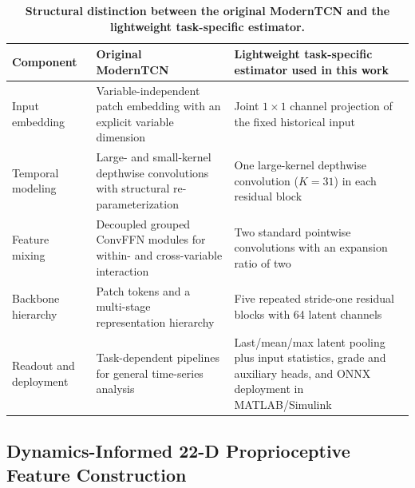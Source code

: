 \documentclass{ieeeaccess}
\newcommand{\citep}[1]{\cite{#1}}
\begin{document}
\begin{table}[!tbp]
\centering
\caption{\textbf{Structural distinction between the original ModernTCN and the lightweight task-specific estimator.}}
\label{tab:moderntcn_variant_comparison}
\setlength{\tabcolsep}{3pt}
\begin{tabular}{|p{}|p{}|p{}|}
\hline
Component & Original ModernTCN~\citep{Luo2024ModernTCN} & Lightweight task-specific estimator used in this work \\
\hline
Input embedding & Variable-independent patch embedding with an explicit variable dimension & Joint $1\times1$ channel projection of the fixed historical input \\
Temporal modeling & Large- and small-kernel depthwise convolutions with structural re-parameterization & One large-kernel depthwise convolution ($K=31$) in each residual block \\
Feature mixing & Decoupled grouped ConvFFN modules for within- and cross-variable interaction & Two standard pointwise convolutions with an expansion ratio of two \\
Backbone hierarchy & Patch tokens and a multi-stage representation hierarchy & Five repeated stride-one residual blocks with 64 latent channels \\
Readout and deployment & Task-dependent pipelines for general time-series analysis & Last/mean/max latent pooling plus input statistics, grade and auxiliary heads, and ONNX deployment in MATLAB/Simulink \\
\hline
\end{tabular}
\end{table}

\subsection{Dynamics-Informed 22-D Proprioceptive Feature Construction}
\end{document}
